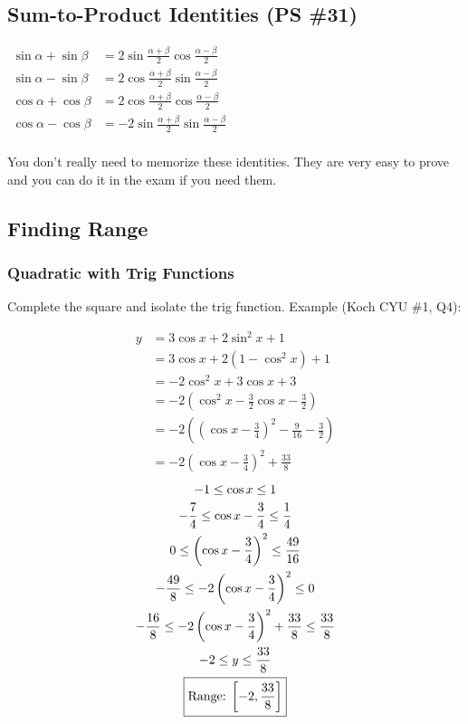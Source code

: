 \documentclass{article}
\begin{document}
\subsection{Sum-to-Product Identities (PS \#31)}
\begin{center}
\hyperref[proof:s2p]{
	$\begin{aligned}
		\sin\alpha+\sin\beta&=
		2\sin\frac{\alpha+\beta}{2}\cos\frac{\alpha-\beta}{2} \\
		\sin\alpha-\sin\beta&=
		2\cos\frac{\alpha+\beta}{2}\sin\frac{\alpha-\beta}{2} \\
		\cos\alpha+\cos\beta&=
		2\cos\frac{\alpha+\beta}{2}\cos\frac{\alpha-\beta}{2} \\
		\cos\alpha-\cos\beta&=
		-2\sin\frac{\alpha+\beta}{2}\sin\frac{\alpha-\beta}{2} \\
	\end{aligned}$
}
\end{center}

You don't really need to memorize these identities. They are
very easy to prove and you can do it in the exam if you need them.

\pagebreak

\subsection{Finding Range}
\subsubsection{Quadratic with Trig Functions}
Complete the square and isolate the trig function. Example (Koch CYU \#1, Q4):
\begin{multicols}{2}
	\begin{align*}
		y&=3\cos x+2\sin^2x+1 \\
		&=3\cos x+2\left(1-\cos^2x\right)+1 \\
		&=-2\cos^2x+3\cos x+3 \\
		&=-2\left(\cos^2x-\frac{3}{2}\cos x-\frac{3}{2}\right) \\
		&=-2\left(\left(\cos x-\frac{3}{4}\right)^2-\frac{9}{16}-\frac{3}{2}\right) \\
		&=-2\left(\cos x-\frac{3}{4}\right)^2+\frac{33}{8}
	\end{align*}
	\begin{gather*}
		-1\leq\cos x\leq1 \\
		-\frac{7}{4}\leq\cos x-\frac{3}{4}\leq\frac{1}{4} \\
		0\leq\left(\cos x-\frac{3}{4}\right)^2\leq\frac{49}{16} \\
		-\frac{49}{8}\leq-2\left(\cos x-\frac{3}{4}\right)^2\leq0 \\
		-\frac{16}{8}\leq-2\left(\cos x-\frac{3}{4}\right)^2+\frac{33}{8}\leq\frac{33}{8} \\
		-2\leq y\leq\frac{33}{8} \\
		\boxed{\text{Range: $\interval[scaled]{-2}{\frac{33}{8}}$}}
	\end{gather*}
\end{multicols}
\end{document}
